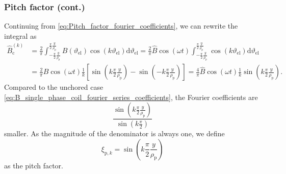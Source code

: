 \begin{frame}
	\frametitle{Pitch factor (cont.)}
    Continuing from \eqref{eq:Pitch_factor_fourier_coefficients}, we can rewrite the integral as
    \begin{equation}
        \begin{split}
            \hat{B}_{\mathrm{c}}^{(k)} &= \frac{2}{\pi} \int_{-\frac{\pi}{2}\frac{y}{\rho_\mathrm{p}}}^{\frac{\pi}{2}\frac{y}{\rho_\mathrm{p}}} B(\vartheta_\mathrm{el}) \cos(k \vartheta_\mathrm{el}) \mathrm{d}\vartheta_\mathrm{el} = \frac{2}{\pi}\hat{B}\cos(\omega t) \int_{-\frac{\pi}{2}\frac{y}{\rho_\mathrm{p}}}^{\frac{\pi}{2}\frac{y}{\rho_\mathrm{p}}} \cos(k \vartheta_\mathrm{el}) \mathrm{d}\vartheta_\mathrm{el}\\
            &= \frac{2}{\pi}\hat{B}\cos(\omega t)\frac{1}{k} \left[\sin(k\frac{\pi}{2}\frac{y}{\rho_\mathrm{p}}) - \sin(-k\frac{\pi}{2}\frac{y}{\rho_\mathrm{p}})\right] = \frac{4}{\pi}\hat{B}\cos(\omega t)\frac{1}{k} \sin(k\frac{\pi}{2}\frac{y}{\rho_\mathrm{p}}).
        \end{split}
        \label{eq:Pitch_factor_fourier_coefficients_rewritten} 
    \end{equation}
    Compared to the unchored case \eqref{eq:B_single_phase_coil_fourier_series_coefficients}, the Fourier coefficients are
    $$\frac{\sin\left(k\frac{\pi}{2}\frac{y}{\rho_\mathrm{p}}\right)}{\sin\left(k\frac{\pi}{2}\right)}$$ smaller. As the magnitude of the denominator is always one, we define
    \begin{equation}
        \xi_{\mathrm{p},k} = \sin\left(k\frac{\pi}{2}\frac{y}{\rho_\mathrm{p}}\right)
        \label{eq:Pitch_factor_definition}
    \end{equation} 
    as the pitch factor.
\end{frame}

